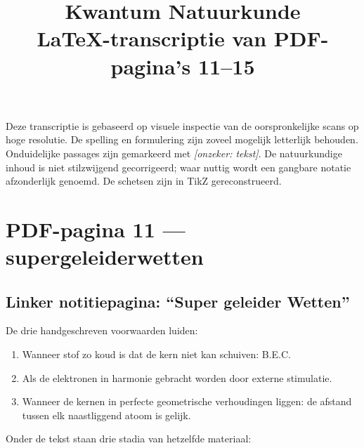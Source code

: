 \documentclass[11pt,a4paper]{article}
\title{\textbf{Kwantum Natuurkunde}\\
\large LaTeX-transcriptie van PDF-pagina's 11--15}
\author{}
\date{}
\newcommand{\uncertain}[1]{\textcolor{uncertain}{\textit{[onzeker: #1]}}}
\begin{document}
\maketitle

\noindent
Deze transcriptie is gebaseerd op visuele inspectie van de oorspronkelijke
scans op hoge resolutie. De spelling en formulering zijn zoveel mogelijk
letterlijk behouden. Onduidelijke passages zijn gemarkeerd met
\uncertain{tekst}. De natuurkundige inhoud is niet stilzwijgend gecorrigeerd;
waar nuttig wordt een gangbare notatie afzonderlijk genoemd. De schetsen zijn
in TikZ gereconstrueerd.

\section*{PDF-pagina 11 --- supergeleiderwetten}

\subsection*{Linker notitiepagina: ``Super geleider Wetten''}

De drie handgeschreven voorwaarden luiden:

\begin{enumerate}[label=\arabic*.,leftmargin=1.7em]
  \item Wanneer stof zo koud is dat de kern niet kan schuiven: B.E.C.
  \item Als de elektronen in harmonie gebracht worden door externe stimulatie.
  \item Wanneer de kernen in perfecte geometrische verhoudingen liggen:
        de afstand tussen elk naastliggend atoom is gelijk.
\end{enumerate}

Onder de tekst staan drie stadia van hetzelfde materiaal:
\end{document}
